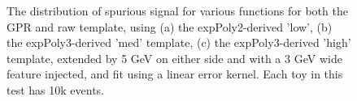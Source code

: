 \begin{figure} 
\begin{center}

\caption{The distribution of spurious signal for various functions for both the GPR and raw template, using (a) the expPoly2-derived 'low', (b) the expPoly3-derived 'med' template, (c) the expPoly3-derived 'high' template, extended by 5 GeV on either side and with a 3 GeV wide feature injected, and fit using a linear error kernel. Each toy in this test has 10k events.}
\label{fig:linearkernel_lowpt_10k_Sig}
\end{center}
\end{figure}

